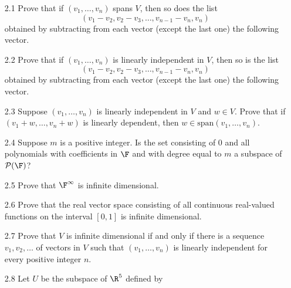 \begin{enumerate}
   \item[2.1]  Prove that if $(v_1, \ldots, v_n)$ spans $V$, then so does the
               list
               $$(v_1 - v_2, v_2 - v_3, \ldots, v_{n - 1} - v_n, v_n)$$
               obtained by subtracting from each vector (except the last one)
               the following vector.
   \item[2.2]  Prove that if $(v_1, \ldots, v_n)$ is linearly independent in
               $V$, then so is the list
               $$(v_1 - v_2, v_2 - v_3, \ldots, v_{n - 1} - v_n, v_n)$$
               obtained by subtracting from each vector (except the last one)
               the following vector.
   \item[2.3]  Suppose $(v_1, \ldots, v_n)$ is linearly independent in $V$ and
               $w \in V$. Prove that if $(v_1 + w, \ldots, v_n + w)$ is linearly
               dependent, then $w \in \text{span}(v_1, \ldots, v_n)$.
   \item[2.4]  Suppose $m$ is a positive integer. Is the set consisting of 0 and
               all polynomials with coefficients in $\F$ and with degree equal
               to $m$ a subspace of $\mathcal{P}(\F)$?
   \item[2.5]  Prove that $\F^\infty$ is infinite dimensional.
   \item[2.6]  Prove that the real vector space consisting of all continuous
               real-valued functions on the interval $[0, 1]$ is infinite
               dimensional.
   \item[2.7]  Prove that $V$ is infinite dimensional if and only if there is a
               sequence $v_1, v_2, \ldots$ of vectors in $V$ such that
               $(v_1, \ldots, v_n)$ is linearly independent for every positive
               integer $n$.
   \item[2.8]  Let $U$ be the subspace of $\R^5$ defined by

\end{enumerate}
